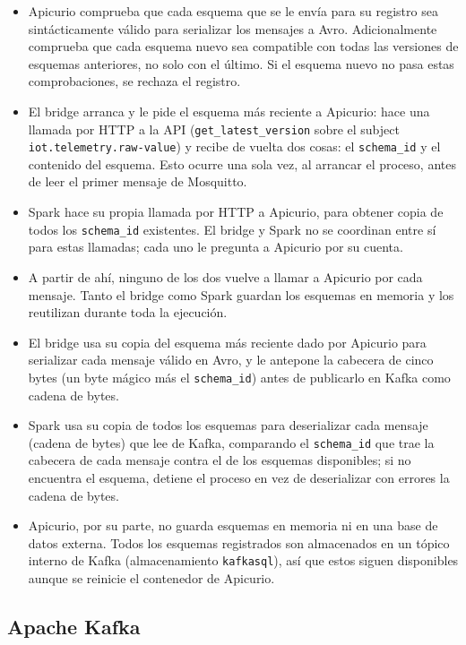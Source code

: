 \begin{itemize}
  \item Apicurio comprueba que cada esquema que se le envía para su registro sea sintácticamente válido para serializar los mensajes a Avro. Adicionalmente comprueba que cada esquema nuevo sea compatible con todas las versiones de esquemas anteriores, no solo con el último. Si el esquema nuevo no pasa estas comprobaciones, se rechaza el registro.
  \item El bridge arranca y le pide el esquema más reciente a Apicurio: hace una llamada por HTTP a la API (\texttt{get\_latest\_version} sobre el subject \texttt{iot.telemetry.raw-value}) y recibe de vuelta dos cosas: el \texttt{schema\_id} y el contenido del esquema. Esto ocurre una sola vez, al arrancar el proceso, antes de leer el primer mensaje de Mosquitto.
  \item Spark hace su propia llamada por HTTP a Apicurio, para obtener copia de todos los \texttt{schema\_id} existentes. El bridge y Spark no se coordinan entre sí para estas llamadas; cada uno le pregunta a Apicurio por su cuenta.
  \item A partir de ahí, ninguno de los dos vuelve a llamar a Apicurio por cada mensaje. Tanto el bridge como Spark guardan los esquemas en memoria y los reutilizan durante toda la ejecución.
  \item El bridge usa su copia del esquema más reciente dado por Apicurio para serializar cada mensaje válido en Avro, y le antepone la cabecera de cinco bytes (un byte mágico más el \texttt{schema\_id}) antes de publicarlo en Kafka como cadena de bytes.
  \item Spark usa su copia de todos los esquemas para deserializar cada mensaje (cadena de bytes) que lee de Kafka, comparando el \texttt{schema\_id} que trae la cabecera de cada mensaje contra el de los esquemas disponibles; si no encuentra el esquema, detiene el proceso en vez de deserializar con errores la cadena de bytes.
  \item Apicurio, por su parte, no guarda esquemas en memoria ni en una base de datos externa. Todos los esquemas registrados son almacenados en un tópico interno de Kafka (almacenamiento \texttt{kafkasql}), así que estos siguen disponibles aunque se reinicie el contenedor de Apicurio.
\end{itemize}

\subsection{Apache Kafka}

